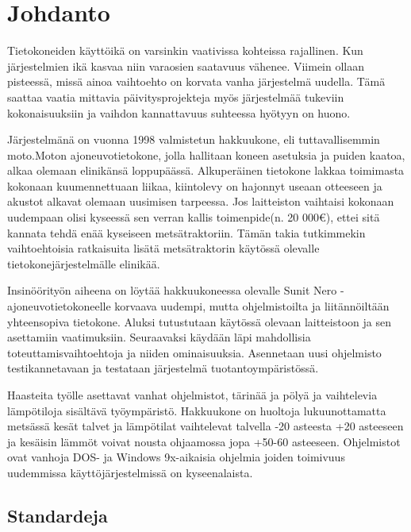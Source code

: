 \documentclass[11pt,a4paper,oneside,article]{memoir}
\begin{document}
\setcounter{page}{1} %
\ClearWallPaper

\chapter{Johdanto}

Tietokoneiden käyttöikä on varsinkin vaativissa kohteissa rajallinen.
Kun järjestelmien ikä kasvaa niin varaosien saatavuus vähenee. Viimein
ollaan pisteessä, missä ainoa vaihtoehto on korvata vanha järjestelmä
uudella. Tämä saattaa vaatia mittavia päivitysprojekteja myös
järjestelmää tukeviin kokonaisuuksiin ja vaihdon kannattavuus suhteessa
hyötyyn on huono.

Järjestelmänä on vuonna 1998 valmistetun hakkuukone, eli tuttavallisemmin moto.Moton ajoneuvotietokone, jolla hallitaan koneen asetuksia ja puiden kaatoa, alkaa olemaan elinikänsä loppupäässä.
Alkuperäinen tietokone lakkaa toimimasta kokonaan kuumennettuaan liikaa,
kiintolevy on hajonnyt useaan otteeseen ja akustot alkavat olemaan
uusimisen tarpeessa. Jos laitteiston vaihtaisi kokonaan uudempaan olisi
kyseessä sen verran kallis toimenpide(n. 20 000\euro{}), ettei sitä
kannata tehdä enää kyseiseen metsätraktoriin. Tämän takia tutkimmekin
vaihtoehtoisia ratkaisuita lisätä metsätraktorin käytössä olevalle
tietokonejärjestelmälle elinikää.

Insinöörityön aiheena on löytää hakkuukoneessa olevalle Sunit Nero -ajoneuvotietokoneelle korvaava uudempi, mutta ohjelmistoilta ja liitännöiltään yhteensopiva tietokone. Aluksi tutustutaan käytössä olevaan laitteistoon ja sen asettamiin vaatimuksiin. Seuraavaksi käydään läpi mahdollisia toteuttamisvaihtoehtoja ja niiden ominaisuuksia. Asennetaan uusi ohjelmisto testikannetavaan ja testataan järjestelmä tuotantoympäristössä.

Haasteita työlle asettavat vanhat ohjelmistot, tärinää ja pölyä ja vaihtelevia lämpötiloja sisältävä työympäristö. Hakkuukone on huoltoja lukuunottamatta metsässä kesät talvet ja lämpötilat vaihtelevat talvella -20 asteesta +20 asteeseen ja kesäisin lämmöt voivat nousta ohjaamossa jopa +50-60 asteeseen. Ohjelmistot ovat vanhoja DOS- ja Windows 9x-aikaisia ohjelmia joiden toimivuus uudemmissa käyttöjärjestelmissä on kyseenalaista.

\section{Standardeja}
\end{document}
